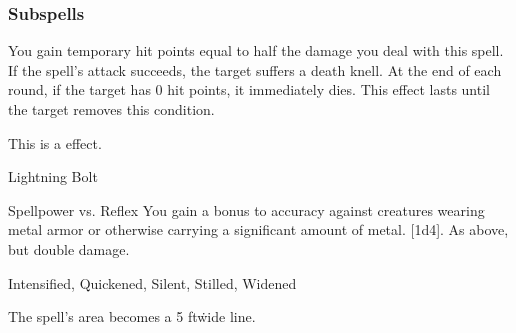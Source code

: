 \subsubsection{Subspells}
You gain temporary hit points equal to half the damage you deal with this spell.
If the spell's attack succeeds, the target suffers a death knell.
At the end of each round, if the target has 0 hit points, it immediately dies.
This effect lasts until the target removes this condition.
\par
This is a  effect.
\begin{spellsection}{Lightning Bolt}
\begin{spellheader}
\end{spellheader}
\begin{spellcontent}
\begin{spelltargetinginfo}
\end{spelltargetinginfo}
\begin{spelleffects}
\begin{spellattack}{Spellpower vs. Reflex}
\spellspecial You gain a  bonus to accuracy against creatures wearing metal armor or otherwise carrying a significant amount of metal.
\spellsuccess
{}[1d4].
\spellcritical As above, but double damage.
\end{spellattack}
\end{spelleffects}
\end{spellcontent}
\begin{spellfooter}
 Intensified, Quickened, Silent, Stilled, Widened
\end{spellfooter}
\begin{spellsubcontent}
\begin{spellcantrip}
The spell's area becomes a 5 ft\. wide \areamed line.
\end{spellcantrip}
\end{spellsubcontent}
\end{spellsection}
